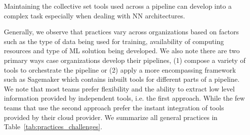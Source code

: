 Maintaining the collective set tools used across a pipeline can develop into a complex task especially when dealing with NN architectures.

Generally, we observe that practices vary across organizations based on factors such as the type of data being used for training, availability of computing resources and type of ML solution being developed. We also note there are two primary ways case organizations develop their pipelines, (1) compose a variety of tools to orchestrate the pipeline or (2) apply a more encompassing framework such as Sagemaker which contains inbuilt tools for different parts of a pipeline. We note that most teams prefer flexibility and the ability to extract low level information provided by independent tools, i.e. the first approach. While the few teams that use the second approach prefer the instant integration of tools provided by their cloud provider. We summarize all general practices in Table~\ref{tab:practices_challenges}.
